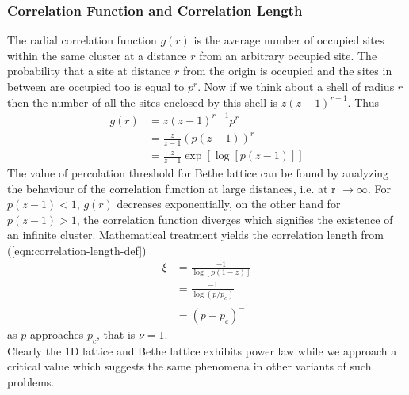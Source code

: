 	\subsubsection{Correlation Function and Correlation Length}
	The radial correlation function $g(r)$ is the average number of occupied sites within the same cluster at a distance $r$ from an arbitrary occupied site. The probability that a site at distance $r$ from the origin is occupied and the sites in between are occupied too is equal to $p^r$. Now if we think about a shell of radius $r$ then the number of all the sites enclosed by this shell is $z(z-1)^{r-1}$. Thus
	\begin{align}
		g(r) &= z(z-1)^{r-1} p^r \\
			 &= \frac{z}{z-1} \left(p(z-1)\right)^r \\
			 &= \frac{z}{z-1} \exp \left[\log\left[p(z-1)\right]\right]
	\end{align}
	The value of percolation threshold for Bethe lattice can be found by analyzing the behaviour of the correlation function at large distances, i.e. at r $\rightarrow \infty$. For $p(z-1) < 1$, $g(r)$ decreases exponentially, on the other hand for $p(z-1)>1$, the correlation function diverges which signifies the existence of an infinite cluster. Mathematical treatment yields the correlation length from (\ref{eqn:correlation-length-def})
	\begin{align}
		\xi &= \frac{-1}{\log[p(1-z)]} \nonumber \\
			&= \frac{-1}{\log(p/p_c)} \nonumber \\
			&= (p-p_c)^{-1}
	\end{align}
	as $p$ approaches $p_c$, that is $\nu = 1$. \\
	Clearly the 1D lattice and Bethe  lattice exhibits power law while we approach a critical value which suggests the same phenomena in other variants of such problems.

